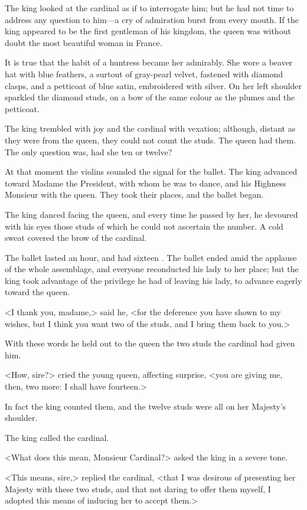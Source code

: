 The king looked at the cardinal as if to interrogate him; but he had not time to address any question to him—a cry of admiration burst from every mouth. If the king appeared to be the first gentleman of his kingdom, the queen was without doubt the most beautiful woman in France. 

It is true that the habit of a huntress became her admirably. She wore a beaver hat with blue feathers, a surtout of gray-pearl velvet, fastened with diamond clasps, and a petticoat of blue satin, embroidered with silver. On her left shoulder sparkled the diamond studs, on a bow of the same colour as the plumes and the petticoat. 

The king trembled with joy and the cardinal with vexation; although, distant as they were from the queen, they could not count the studs. The queen had them. The only question was, had she ten or twelve? 

At that moment the violins sounded the signal for the ballet. The king advanced toward Madame the President, with whom he was to dance, and his Highness Monsieur with the queen. They took their places, and the ballet began. 

The king danced facing the queen, and every time he passed by her, he devoured with his eyes those studs of which he could not ascertain the number. A cold sweat covered the brow of the cardinal. 

The ballet lasted an hour, and had sixteen . The ballet ended amid the applause of the whole assemblage, and everyone reconducted his lady to her place; but the king took advantage of the privilege he had of leaving his lady, to advance eagerly toward the queen. 

<I thank you, madame,> said he, <for the deference you have shown to my wishes, but I think you want two of the studs, and I bring them back to you.> 

With these words he held out to the queen the two studs the cardinal had given him. 

<How, sire?> cried the young queen, affecting surprise, <you are giving me, then, two more: I shall have fourteen.> 

In fact the king counted them, and the twelve studs were all on her Majesty's shoulder. 

The king called the cardinal. 

<What does this mean, Monsieur Cardinal?> asked the king in a severe tone. 

<This means, sire,> replied the cardinal, <that I was desirous of presenting her Majesty with these two studs, and that not daring to offer them myself, I adopted this means of inducing her to accept them.> 

